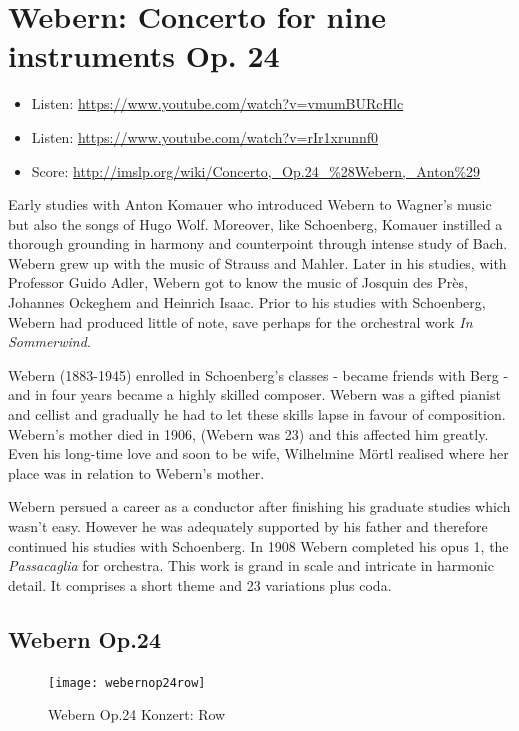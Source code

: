 \section{Webern: Concerto for nine instruments Op. 24}

\begin{itemize}
\item Listen: \url{https://www.youtube.com/watch?v=vmumBURcHlc}
\item Listen: \url{https://www.youtube.com/watch?v=rIr1xrunnf0}
\item Score: \url{http://imslp.org/wiki/Concerto,_Op.24_%28Webern,_Anton%29}
\end{itemize}

Early studies with Anton Komauer who introduced Webern to Wagner's music but also the songs of Hugo Wolf. Moreover, like Schoenberg, Komauer instilled a thorough grounding in harmony and counterpoint through intense study of Bach. Webern grew up with the music of Strauss and Mahler. Later in his studies, with Professor Guido Adler, Webern got to know the music of Josquin des Pr\`es, Johannes Ockeghem and Heinrich Isaac. Prior to his studies with Schoenberg, Webern had produced little of note, save perhaps for the orchestral work \textit{In Sommerwind}. 

Webern (1883-1945) enrolled in Schoenberg's classes - became friends with Berg - and in four years became a highly skilled composer. Webern was a gifted pianist and cellist and gradually he had to let these skills lapse in favour of composition. Webern's mother died in 1906, (Webern was 23) and this affected him greatly. Even his long-time love and soon to be wife, Wilhelmine M\"ortl realised where her place was in relation to Webern's mother. 

Webern persued a career as a conductor after finishing his graduate studies which wasn't easy. However he was adequately supported by his father and therefore continued his studies with Schoenberg. In 1908 Webern completed his opus 1, the \textit{Passacaglia} for orchestra. This work is grand in scale and intricate in harmonic detail. It comprises a short theme and 23 variations plus coda. 

\subsection{Webern Op.24}
 
\begin{figure}[H]
\centering
\texttt{[image: webernop24row]}\caption{Webern Op.24 Konzert: Row}
\label{fig:op24row}
\end{figure}

